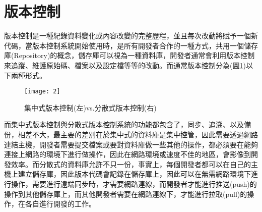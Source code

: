 \renewcommand{\baselinestretch}{20} %
\section{版本控制}
\par
\renewcommand{\baselinestretch}{1} %
\twelve \qquad 版本控制是一種紀錄資料變化或內容改變的完整歷程，並且每次改動將賦予一個新代碼，當版本控制系統開始使用時，是所有開發者合作的一種方式，共用一個儲存庫(Repository)的概念，儲存庫可以視為一種資料庫，開發者通常會利用版本控制來追蹤、維護原始碼、檔案以及設定檔等等的改動。而通常版本控制分為(圖\ref{fig.版本控制})以下兩種形式。
\\
\par
\renewcommand{\baselinestretch}{1.7} %
\begin{figure}[hbt!]
\begin{center}
\texttt{[image: 2]}
\caption{\large 集中式版本控制(左)\enspace vs.分散式版本控制(右)}\label{fig.版本控制}
\end{center}
\end{figure}
\par
\renewcommand{\baselinestretch}{1} %
\twelve \hspace{0.5em} 而集中式版本控制與分散式版本控制系統的功能都包含了，同步、追溯、以及備份，相差不大，最主要的差別在於集中式的資料庫是集中控管，因此需要透過網路連結主機，開發者需要提交檔案或要對資料庫做一些其他的操作，都必須要在能夠連接上網路的環境下進行做操作，因此在網路環境或速度不佳的地區，會影像到開發效率。而分散式的資料庫允許不只一份，事實上，每個開發者都可以在自己的主機上建立儲存庫，因此版本代碼會記錄在儲存庫上，因此可以在無需網路環境下進行操作，需要進行遠端同步時，才需要網路連線，而開發者才能進行推送(push)的操作到其他儲存庫上，而其他開發者需要在網路連線下，才能進行拉取(pull)的操作，在各自進行開發的工作。
\par

\renewcommand{\baselinestretch}{20} %
